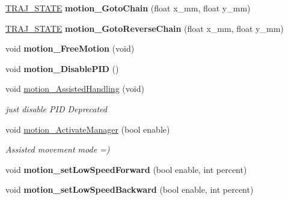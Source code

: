 \begin{DoxyCompactItemize}
\mbox{\label{classAsservDriver_a990f4ca32eef38a88031daa07fbe4546}} 
\hyperlink{path__manager_8h_adb3360abeb29758da93865c8afcb80eb}{T\+R\+A\+J\+\_\+\+S\+T\+A\+TE} {\bfseries motion\+\_\+\+Goto\+Chain} (float x\+\_\+mm, float y\+\_\+mm)
\item 
\mbox{\label{classAsservDriver_a724a7b68fdf74793ee2d159f82fe50e5}} 
\hyperlink{path__manager_8h_adb3360abeb29758da93865c8afcb80eb}{T\+R\+A\+J\+\_\+\+S\+T\+A\+TE} {\bfseries motion\+\_\+\+Goto\+Reverse\+Chain} (float x\+\_\+mm, float y\+\_\+mm)
\item 
\mbox{\label{classAsservDriver_ac9f37c4408c0a72913bd57f7f6ffa576}} 
void {\bfseries motion\+\_\+\+Free\+Motion} (void)
\item 
\mbox{\label{classAsservDriver_a0a68a702d1fea277c2e24e6dceb2d646}} 
void {\bfseries motion\+\_\+\+Disable\+P\+ID} ()
\item 
\mbox{\label{classAsservDriver_a11586683bd733079461ba5edcdcc7e89}} 
void \hyperlink{classAsservDriver_a11586683bd733079461ba5edcdcc7e89}{motion\+\_\+\+Assisted\+Handling} (void)
\begin{DoxyCompactList}\small\item\em just disable P\+ID Deprecated \end{DoxyCompactList}\item 
\mbox{\label{classAsservDriver_aaeb3c80c8a079c812af38273f825c537}} 
void \hyperlink{classAsservDriver_aaeb3c80c8a079c812af38273f825c537}{motion\+\_\+\+Activate\+Manager} (bool enable)
\begin{DoxyCompactList}\small\item\em Assisted movement mode =) \end{DoxyCompactList}\item 
\mbox{\label{classAsservDriver_a17a6651fc8ecebafc085c46af984b099}} 
void {\bfseries motion\+\_\+set\+Low\+Speed\+Forward} (bool enable, int percent)
\item 
\mbox{\label{classAsservDriver_ac01272d7ef32443b3c283186041324c3}} 
void {\bfseries motion\+\_\+set\+Low\+Speed\+Backward} (bool enable, int percent)

\end{DoxyCompactItemize}
